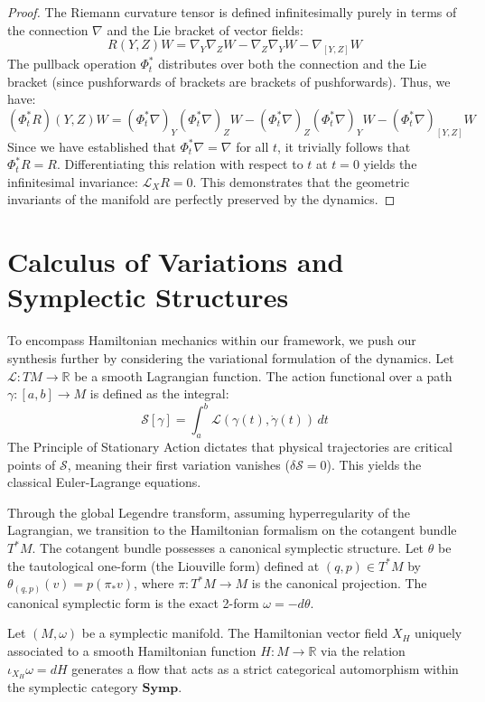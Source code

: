 \begin{proof}
The Riemann curvature tensor is defined infinitesimally purely in terms of the connection $\nabla$ and the Lie bracket of vector fields:
\[ R(Y, Z)W = \nabla_Y \nabla_Z W - \nabla_Z \nabla_Y W - \nabla_{[Y,Z]} W \]
The pullback operation $\Phi_t^*$ distributes over both the connection and the Lie bracket (since pushforwards of brackets are brackets of pushforwards). Thus, we have:
\[ (\Phi_t^* R)(Y, Z)W = (\Phi_t^* \nabla)_Y (\Phi_t^* \nabla)_Z W - (\Phi_t^* \nabla)_Z (\Phi_t^* \nabla)_Y W - (\Phi_t^* \nabla)_{[Y,Z]} W \]
Since we have established that $\Phi_t^* \nabla = \nabla$ for all $t$, it trivially follows that $\Phi_t^* R = R$. Differentiating this relation with respect to $t$ at $t=0$ yields the infinitesimal invariance: $\mathcal{L}_X R = 0$. This demonstrates that the geometric invariants of the manifold are perfectly preserved by the dynamics.
\end{proof}

\section{Calculus of Variations and Symplectic Structures}
\label{sec:symp}

To encompass Hamiltonian mechanics within our framework, we push our synthesis further by considering the variational formulation of the dynamics. Let $\mathcal{L}: TM \to \mathbb{R}$ be a smooth Lagrangian function. The action functional over a path $\gamma: [a, b] \to M$ is defined as the integral:
\[ \mathcal{S}[\gamma] = \int_a^b \mathcal{L}(\gamma(t), \dot{\gamma}(t)) \, dt \]
The Principle of Stationary Action dictates that physical trajectories are critical points of $\mathcal{S}$, meaning their first variation vanishes ($\delta \mathcal{S} = 0$). This yields the classical Euler-Lagrange equations.

Through the global Legendre transform, assuming hyperregularity of the Lagrangian, we transition to the Hamiltonian formalism on the cotangent bundle $T^*M$. The cotangent bundle possesses a canonical symplectic structure. Let $\theta$ be the tautological one-form (the Liouville form) defined at $(q, p) \in T^*M$ by $\theta_{(q,p)}(v) = p(\pi_* v)$, where $\pi: T^*M \to M$ is the canonical projection. The canonical symplectic form is the exact 2-form $\omega = -d\theta$.

\begin{lemma}
\label{lem:symp}
Let $(M, \omega)$ be a symplectic manifold. The Hamiltonian vector field $X_H$ uniquely associated to a smooth Hamiltonian function $H: M \to \mathbb{R}$ via the relation $\iota_{X_H} \omega = dH$ generates a flow that acts as a strict categorical automorphism within the symplectic category $\mathbf{Symp}$.
\end{lemma}

